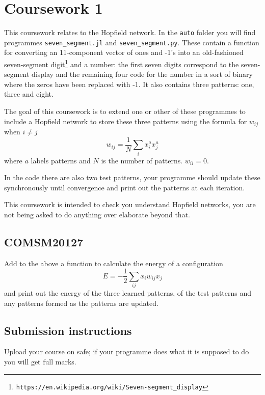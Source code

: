 \documentclass[12pt]{article}
\begin{document}
\section*{Coursework 1}

This coursework relates to the Hopfield network. In the \texttt{auto}
folder you will find programmes \texttt{seven\_segment.jl} and
\texttt{seven\_segment.py}. These contain a function for converting an
11-component vector of ones and -1's into an old-fashioned
seven-segment digit\footnote{\texttt{https://en.wikipedia.org/wiki/Seven-segment\_display}} and a number: the first seven digits correspond to
the seven-segment display and the remaining four code for the number
in a sort of binary where the zeros have been replaced with -1. It
also contains three patterns: one, three and eight.

The goal of this coursework is to extend one or other of these
programmes to include a Hopfield network to store these three
patterns using the formula for $w_{ij}$ when $i\not=j$
\begin{equation}
w_{ij}=\frac{1}{N}\sum_i x_i^a x_j^a
\end{equation}
where $a$ labels patterns and $N$ is the number of
patterns. $w_{ii}=0$.

In the code there are also two test patterns, your programme should
update these synchronously until convergence and print out the
patterns at each iteration. 

This coursework is intended to check you understand Hopfield networks,
you are not being asked to do anything over elaborate beyond that.

\subsection*{COMSM20127}

Add to the above a function to calculate the energy of a configuration
\begin{equation}
E=-\frac{1}{2}\sum_{ij} x_i w_{ij} x_j
\end{equation}
and print out the energy of the three learned patterns, of the test
patterns and any patterns formed as the patterns are updated.

\subsection*{Submission instructions}

Upload your course on safe; if your programme does what it is supposed
to do you will get full marks.
\end{document}
